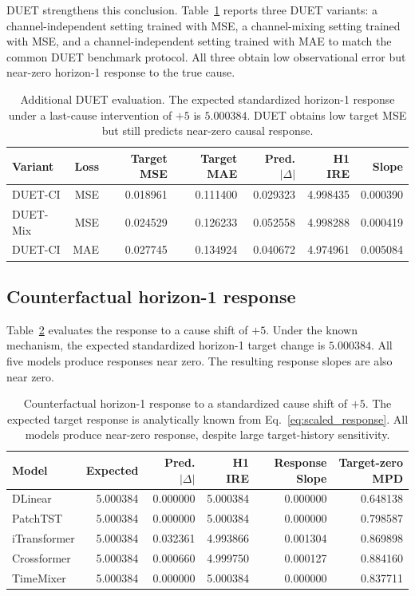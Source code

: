\documentclass{article}
\begin{document}
DUET strengthens this conclusion. Table~\ref{tab:duet} reports three DUET variants:
a channel-independent setting trained with MSE, a channel-mixing setting trained with
MSE, and a channel-independent setting trained with MAE to match the common DUET
benchmark protocol. All three obtain low observational error but near-zero
horizon-1 response to the true cause.

\begin{table}[t]
\centering
\caption{Additional DUET evaluation. The expected standardized horizon-1 response
under a last-cause intervention of $+5$ is $5.000384$. DUET obtains low target MSE
but still predicts near-zero causal response.}
\label{tab:duet}
\begin{tabular}{lrrrrrr}
\toprule
Variant & Loss & Target MSE & Target MAE & Pred. $|\Delta|$ & H1 IRE & Slope \\
\midrule
DUET-CI  & MSE & 0.018961 & 0.111400 & 0.029323 & 4.998435 & 0.000390 \\
DUET-Mix & MSE & 0.024529 & 0.126233 & 0.052558 & 4.998288 & 0.000419 \\
DUET-CI  & MAE & 0.027745 & 0.134924 & 0.040672 & 4.974961 & 0.005084 \\
\bottomrule
\end{tabular}
\end{table}

\subsection{Counterfactual horizon-1 response}

Table~\ref{tab:h1} evaluates the response to a cause shift of $+5$. Under the known
mechanism, the expected standardized horizon-1 target change is $5.000384$. All five
models produce responses near zero. The resulting response slopes are also near zero.

\begin{table}[t]
\centering
\caption{Counterfactual horizon-1 response to a standardized cause shift of $+5$.
The expected target response is analytically known from Eq.~\eqref{eq:scaled_response}.
All models produce near-zero response, despite large target-history sensitivity.}
\label{tab:h1}
\begin{tabular}{lrrrrr}
\toprule
Model & Expected & Pred. $|\Delta|$ & H1 IRE & Response Slope & Target-zero MPD \\
\midrule
DLinear      & 5.000384 & 0.000000 & 5.000384 & 0.000000 & 0.648138 \\
PatchTST     & 5.000384 & 0.000000 & 5.000384 & 0.000000 & 0.798587 \\
iTransformer & 5.000384 & 0.032361 & 4.993866 & 0.001304 & 0.869898 \\
Crossformer  & 5.000384 & 0.000660 & 4.999750 & 0.000127 & 0.884160 \\
TimeMixer    & 5.000384 & 0.000000 & 5.000384 & 0.000000 & 0.837711 \\
\bottomrule
\end{tabular}
\end{table}
\end{document}

